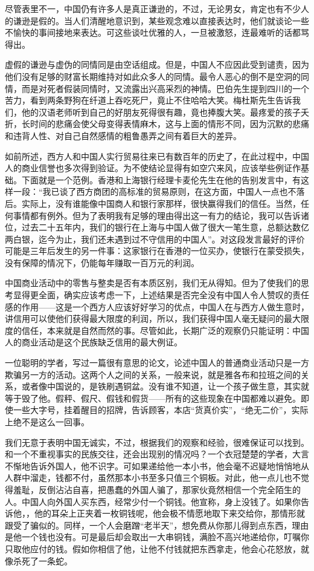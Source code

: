 \documentclass[12pt,oneside]{book}
\begin{document}
\begin{common-format}
尽管表里不一，中国仍有许多人是真正谦逊的，不过，无论男女，肯定也有不少人的谦逊是假的。当人们清醒地意识到，某些观念难以直接表达时，他们就谈论一些不愉快的事间接地来表达。可这些谈吐优雅的人，一旦被激怒，连最难听的话都骂得出。 

虚假的谦逊与虚伪的同情同是由空话组成。但是，中国人不应因此受到谴责，因为他们没有足够的财富长期维持对如此众多人的同情。最令人恶心的倒不是空洞的同情，而是对死者假装同情时，又流露出兴高采烈的神情。巴伯先生提到四川的一个苦力，看到两条野狗在纤道上吞吃死尸，竟止不住哈哈大笑。梅杜斯先生告诉我们，他的汉语老师听到自己的好朋友死得很有趣，竟也捧腹大笑。最疼爱的孩子夭折，长时间的悲痛会使父母变得表情麻木，这与上面的情形不同，因为沉默的悲痛和违背人性、对自己自然感情的粗鲁愚弄之间有着巨大的差异。 

如前所述，西方人和中国人实行贸易往来已有数百年的历史了，在此过程中，中国人的商业信誉也多次得到验证。为不使结论显得有如空穴来风，应该举些例证作基础。下面就是一个范例。香港和上海银行经理卡麦伦先生在他的告别发言中，有这样一段：“我已谈了西方商团的高标准的贸易原则，在这方面，中国人一点也不落后。实际上，没有谁能像中国商人和银行家那样，很快赢得我们的信任。当然，任何事情都有例外。但为了表明我有足够的理由得出这一有力的结论，我可以告诉诸位，过去二十五年内，我们的银行在上海与中国人做了很大一笔生意，总额达数亿两白银，迄今为止，我们还未遇到过不守信用的中国人”。对这段发言最好的评价可能是三年后发生的另一件事：这家银行在香港的一位买办，使银行在蒙受损失，没有保障的情况下，仍能每年赚取一百万元的利润。 

中国商业活动中的零售与整卖是否有本质区别，我们无从得知。但为了使我们的思考显得更全面，确实应该考虑一下，上述结果是否完全没有中国人令人赞叹的责任感的作用——这是一个西方人应该好好学习的优点，中国人在与西方人做生意时，讲信用可以使他们获得最大限度的利润，所以，我们获得中国人毫无疑问的最大限度的信任，本来就是自然而然的事。尽管如此，长期广泛的观察仍只能证明：中国人的商业活动是这个民族缺乏信用的最大例证。 

一位聪明的学者，写过一篇很有意思的论文，论述中国人的普通商业活动只是一方欺骗另一方的活动。这两个人之间的关系，一般来说，就是雅各布和拉班之间的关系，或者像中国说的，是铁刷遇铜盆。没有谁不知道，让一个孩子做生意，其实就等于毁了他。假秤、假尺、假钱和假货——所有的这些现象在中国都难以避免。即使一些大字号，挂着醒目的招牌，告诉顾客，本店“货真价实”，“绝无二价”，实际上绝不是这么一回事。 

我们无意于表明中国无诚实，不过，根据我们的观察和经验，很难保证可以找到。和一个不重视事实的民族交往，还会出现别的情况吗？一个衣冠楚楚的学者，大言不惭地告诉外国人，他不识字。可如果递给他一本小书，他会毫不迟疑地悄悄地从人群中溜走，钱都不付，虽然那本小书至多只值三个铜板。对此，他一点儿也不觉得羞耻，反倒沾沾自喜，把愚蠢的外国人骗了，那家伙竟然相信一个完全陌生的人。中国人向外国人买东西，经常少付一个铜钱。他宣称，身上没钱了。如果你告诉他，，他的耳朵上正夹着一枚铜钱呢，他会极不情愿地取下来交给你，那情形就跟受了骗似的。同样，一个人会磨蹭“老半天”，想免费从你那儿得到点东西，理由是他一个钱也没有。可是最后却会取出一大串铜钱，满脸不高兴地递给你，叮嘱你只取他应付的钱。假如你相信了他，让他不付钱就把东西拿走，他会心花怒放，就像杀死了一条蛇。 


\end{common-format}
\end{document}
